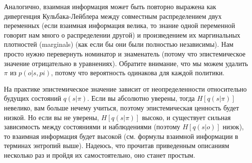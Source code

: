 \documentclass[12pt]{article}
\begin{document}
\begin{figure}[h]
\end{figure}

Аналогично, взаимная информация может быть повторно выражена как дивергенция Кульбака-Лейблера между совместным распределением двух переменных (если взаимная информация велика, то знание одной переменной говорит нам много о распределении другой) и произведением их маргинальных плотностей (marginals) (как если бы они были полностью независимы). Нам просто нужно перевернуть номинатор и знаменатель (потому что эпистемическое значение отрицательно в уравнениях). Обратите внимание, что мы можем удалить $\pi$ из $p(o|s, pi)$, потому что вероятность одинакова для каждой политики.


\begin{figure}[h]
\end{figure}

На практике эпистемическое значение зависит от неопределенности относительно будущих состояний $q(s|\pi)$. Если вы абсолютно уверены, тогда $H[q(s|\pi)]$ невелико, вам больше нечему учиться, поэтому эпистемическая ценность будет низкой. Но если вы не уверены, $H[q(s|\pi)]$ высоко, и существует сильная зависимость между состояниями и наблюдениями (поэтому $H[q(s|o)]$ низок), то взаимная информация будет высокой (см. формулы взаимной информации в терминах энтропий выше). Надеюсь, что прочитав приведенным описаниям несколько раз и пройдя их самостоятельно, оно станет простым.
\end{document}
